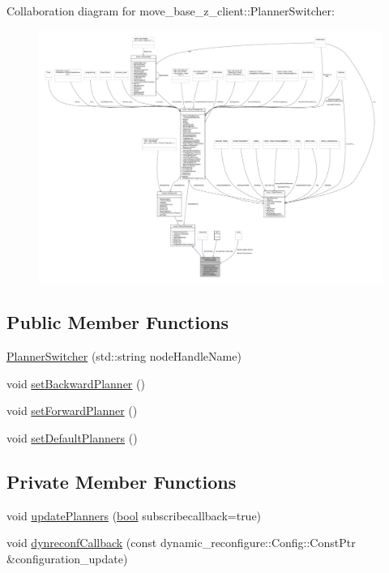 Collaboration diagram for move\+\_\+base\+\_\+z\+\_\+client\+:\+:Planner\+Switcher\+:\nopagebreak
\begin{figure}[H]
\begin{center}
\leavevmode
\includegraphics[width=350pt]{classmove__base__z__client_1_1PlannerSwitcher__coll__graph}
\end{center}
\end{figure}
\subsection*{Public Member Functions}
\begin{DoxyCompactItemize}
\item 
\hyperlink{classmove__base__z__client_1_1PlannerSwitcher_a6f07fd7796bc3c9abf2c219ec33d27d3}{Planner\+Switcher} (std\+::string node\+Handle\+Name)
\item 
void \hyperlink{classmove__base__z__client_1_1PlannerSwitcher_a7688616d66fbfe6486c0cbe77e688114}{set\+Backward\+Planner} ()
\item 
void \hyperlink{classmove__base__z__client_1_1PlannerSwitcher_a4797022f304538949a2019b351ec47a8}{set\+Forward\+Planner} ()
\item 
void \hyperlink{classmove__base__z__client_1_1PlannerSwitcher_aa31306368ab2a5145c024c0c1a580547}{set\+Default\+Planners} ()
\end{DoxyCompactItemize}
\subsection*{Private Member Functions}
\begin{DoxyCompactItemize}
\item 
void \hyperlink{classmove__base__z__client_1_1PlannerSwitcher_a189ac8c027169a111c7d8e14d864752f}{update\+Planners} (\hyperlink{classbool}{bool} subscribecallback=true)
\item 
void \hyperlink{classmove__base__z__client_1_1PlannerSwitcher_a7eacfedc6b6ea404ee8fab062d62a911}{dynreconf\+Callback} (const dynamic\+\_\+reconfigure\+::\+Config\+::\+Const\+Ptr \&configuration\+\_\+update)
\end{DoxyCompactItemize}
